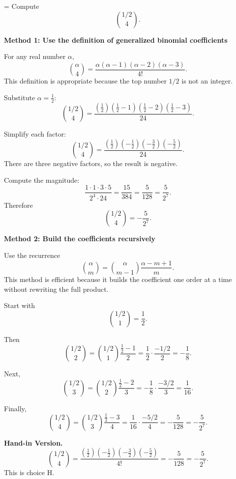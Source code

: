 \documentclass[a4paper,12pt,twocolumn]{article}
\newlength{\problemnumberwidth}
\newenvironment{solutionbox}{\begin{framed}}{\end{framed}}
\newcommand{\problem}[3]{%
  \Needspace{10\baselineskip}%
  \phantomsection\label{#1}%
  \par\vspace{0.8em}%
  \noindent
  \hangindent=\problemnumberwidth
  \hangafter=1
  \makebox[\problemnumberwidth][l]{\textbf{#2.}}#3\par
}
\begin{document}
\problem{prob:xiii}{xiii}{Compute
\[
\binom{1/2}{4}.
\]}

\begin{solutionbox}
\textbf{Method 1: Use the definition of generalized binomial coefficients}

\begin{steps}
\item For any real number \(\alpha\),
\[
\binom{\alpha}{4}
=\frac{\alpha(\alpha-1)(\alpha-2)(\alpha-3)}{4!}.
\]
This definition is appropriate because the top number \(1/2\) is not an integer.

\item Substitute \(\alpha=\frac12\):
\[
\binom{1/2}{4}
=\frac{\left(\frac12\right)\left(\frac12-1\right)
\left(\frac12-2\right)\left(\frac12-3\right)}{24}.
\]

\item Simplify each factor:
\[
\binom{1/2}{4}
=\frac{\left(\frac12\right)\left(-\frac12\right)
\left(-\frac32\right)\left(-\frac52\right)}{24}.
\]
There are three negative factors, so the result is negative.

\item Compute the magnitude:
\[
\frac{1\cdot1\cdot3\cdot5}{2^4\cdot24}
=\frac{15}{384}
=\frac{5}{128}
=\frac{5}{2^7}.
\]
Therefore
\[
\binom{1/2}{4}=-\frac{5}{2^7}.
\]
\end{steps}
\end{solutionbox}

\begin{solutionbox}
\textbf{Method 2: Build the coefficients recursively}

\begin{steps}
\item Use the recurrence
\[
\binom{\alpha}{m}
=\binom{\alpha}{m-1}\frac{\alpha-m+1}{m}.
\]
This method is efficient because it builds the coefficient one order at a time without rewriting the full product.

\item Start with
\[
\binom{1/2}{1}=\frac12.
\]

\item Then
\[
\binom{1/2}{2}
=\binom{1/2}{1}\frac{\frac12-1}{2}
=\frac12\cdot\frac{-1/2}{2}
=-\frac18.
\]

\item Next,
\[
\binom{1/2}{3}
=\binom{1/2}{2}\frac{\frac12-2}{3}
=-\frac18\cdot\frac{-3/2}{3}
=\frac1{16}.
\]

\item Finally,
\[
\binom{1/2}{4}
=\binom{1/2}{3}\frac{\frac12-3}{4}
=\frac1{16}\cdot\frac{-5/2}{4}
=-\frac5{128}
=-\frac5{2^7}.
\]
\end{steps}

\textbf{Hand-in Version.}
\[
\binom{1/2}{4}
=\frac{\left(\frac12\right)\left(-\frac12\right)
\left(-\frac32\right)\left(-\frac52\right)}{4!}
=-\frac{5}{128}
=\boxed{-\frac5{2^7}}.
\]
This is choice \(\boxed{\text{H}}\).
\end{solutionbox}
\end{document}
